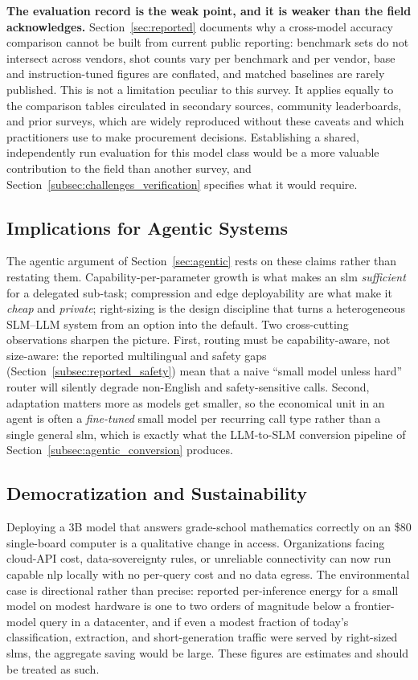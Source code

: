 \textbf{The evaluation record is the weak point, and it is weaker than the field
acknowledges.} Section~\ref{sec:reported} documents why a cross-model accuracy
comparison cannot be built from current public reporting: benchmark sets do not
intersect across vendors, shot counts vary per benchmark and per vendor, base and
instruction-tuned figures are conflated, and matched baselines are rarely
published. This is not a limitation peculiar to this survey. It applies equally
to the comparison tables circulated in secondary sources, community leaderboards,
and prior surveys, which are widely reproduced without these caveats and which
practitioners use to make procurement decisions. Establishing a shared,
independently run evaluation for this model class would be a more valuable
contribution to the field than another survey, and
Section~\ref{subsec:challenges_verification} specifies what it would require.

\subsection{Implications for Agentic Systems}
\label{subsec:discussion_agentic}

The agentic argument of Section~\ref{sec:agentic} rests on these claims rather
than restating them. Capability-per-parameter growth is what makes an \gls{slm}
\emph{sufficient} for a delegated sub-task; compression and edge deployability are
what make it \emph{cheap} and \emph{private}; right-sizing is the design
discipline that turns a heterogeneous SLM--LLM system from an option into the
default. Two cross-cutting observations sharpen the picture. First, routing must
be capability-aware, not size-aware: the reported multilingual and safety gaps
(Section~\ref{subsec:reported_safety}) mean that a naive ``small model unless
hard'' router will silently degrade non-English and safety-sensitive calls.
Second, adaptation matters more as models get smaller, so the economical unit in
an agent is often a \emph{fine-tuned} small model per recurring call type rather
than a single general \gls{slm}, which is exactly what the LLM-to-SLM conversion
pipeline of Section~\ref{subsec:agentic_conversion} produces.

\subsection{Democratization and Sustainability}
\label{subsec:discussion_implications}

Deploying a 3B model that answers grade-school mathematics correctly on an
\$80 single-board computer is a qualitative change in access. Organizations facing
cloud-API cost, data-sovereignty rules, or unreliable connectivity can now run
capable \gls{nlp} locally with no per-query cost and no data egress. The environmental
case is directional rather than precise: reported per-inference energy for a small
model on modest hardware is one to two orders of magnitude below a frontier-model
query in a datacenter, and if even a modest fraction of today's classification,
extraction, and short-generation traffic were served by right-sized \glspl{slm}, the
aggregate saving would be large. These figures are estimates and should be treated
as such.

